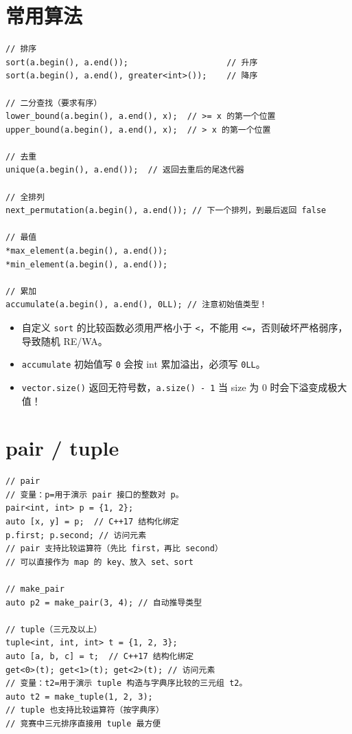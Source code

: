 \documentclass[UTF8,openany,oneside,zihao=-4]{ctexbook}
\begin{document}
\section{常用算法}

\begin{lstlisting}
// 排序
sort(a.begin(), a.end());                    // 升序
sort(a.begin(), a.end(), greater<int>());    // 降序

// 二分查找（要求有序）
lower_bound(a.begin(), a.end(), x);  // >= x 的第一个位置
upper_bound(a.begin(), a.end(), x);  // > x 的第一个位置

// 去重
unique(a.begin(), a.end());  // 返回去重后的尾迭代器

// 全排列
next_permutation(a.begin(), a.end()); // 下一个排列，到最后返回 false

// 最值
*max_element(a.begin(), a.end());
*min_element(a.begin(), a.end());

// 累加
accumulate(a.begin(), a.end(), 0LL); // 注意初始值类型！
\end{lstlisting}

\begin{warn}
\begin{itemize}
  \item 自定义 \lstinline|sort| 的比较函数必须用严格小于 \lstinline|<|，不能用 \lstinline|<=|，否则破坏严格弱序，导致随机 RE/WA。
  \item \lstinline|accumulate| 初始值写 \lstinline|0| 会按 int 累加溢出，必须写 \lstinline|0LL|。
  \item \lstinline|vector.size()| 返回无符号数，\lstinline|a.size() - 1| 当 size 为 0 时会下溢变成极大值！
\end{itemize}
\end{warn}

\section{pair / tuple}

\begin{lstlisting}
// pair
// 变量：p=用于演示 pair 接口的整数对 p。
pair<int, int> p = {1, 2};
auto [x, y] = p;  // C++17 结构化绑定
p.first; p.second; // 访问元素
// pair 支持比较运算符（先比 first，再比 second）
// 可以直接作为 map 的 key、放入 set、sort

// make_pair
auto p2 = make_pair(3, 4); // 自动推导类型

// tuple（三元及以上）
tuple<int, int, int> t = {1, 2, 3};
auto [a, b, c] = t;  // C++17 结构化绑定
get<0>(t); get<1>(t); get<2>(t); // 访问元素
// 变量：t2=用于演示 tuple 构造与字典序比较的三元组 t2。
auto t2 = make_tuple(1, 2, 3);
// tuple 也支持比较运算符（按字典序）
// 竞赛中三元排序直接用 tuple 最方便
\end{lstlisting}
\end{document}
